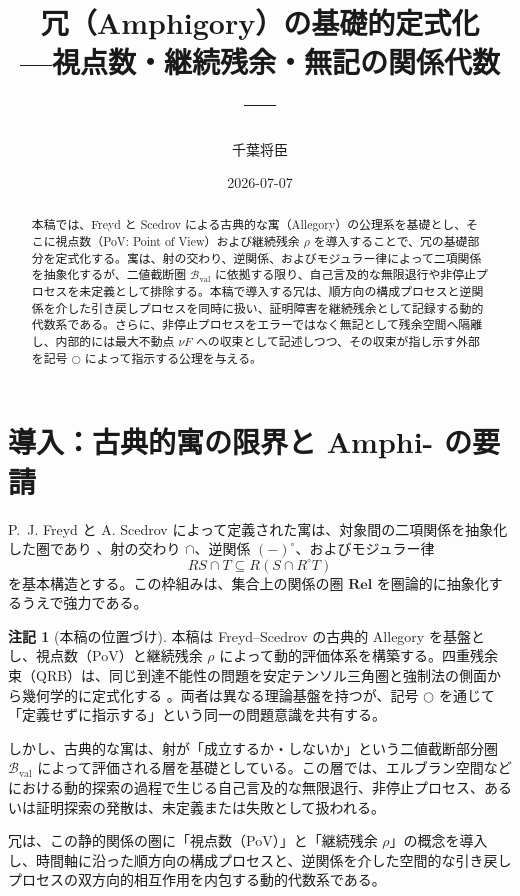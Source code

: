\documentclass[a4paper,11pt]{article}
\title{冗（Amphigory）の基礎的定式化\\
---視点数・継続残余・無記の関係代数---}
\author{千葉将臣}
\date{2026-07-07}
\newcommand{\dfix}{\bigcirc}
\newcommand{\Rel}{\mathbf{Rel}}
\theoremstyle{definition}
\newtheorem{note}[definition]{注記}
\begin{document}
\maketitle

\begin{abstract}
本稿では、Freyd と Scedrov による古典的な寓（Allegory）の公理系を基礎とし、そこに視点数（PoV: Point of View）および継続残余 $\rho$ を導入することで、冗の基礎部分を定式化する。寓は、射の交わり、逆関係、およびモジュラー律によって二項関係を抽象化するが、二値截断圏 $\mathcal{B}_{\mathrm{val}}$ に依拠する限り、自己言及的な無限退行や非停止プロセスを未定義として排除する。本稿で導入する冗は、順方向の構成プロセスと逆関係を介した引き戻しプロセスを同時に扱い、証明障害を継続残余として記録する動的代数系である。さらに、非停止プロセスをエラーではなく無記として残余空間へ隔離し、内部的には最大不動点 $\nu F$ への収束として記述しつつ、その収束が指し示す外部を記号 $\dfix$ によって指示する公理を与える。
\end{abstract}

\section{導入：古典的寓の限界と Amphi- の要請}
P.~J. Freyd と A. Scedrov によって定義された寓は、対象間の二項関係を抽象化した圏であり \cite{FreydScedrov1990}、射の交わり $\cap$、逆関係 $(-)^\circ$、およびモジュラー律
\[
RS \cap T \subseteq R(S \cap R^\circ T)
\]
を基本構造とする。この枠組みは、集合上の関係の圏 $\Rel$ を圏論的に抽象化するうえで強力である。

\begin{note}[本稿の位置づけ]
本稿は Freyd--Scedrov の古典的 Allegory を基盤とし、視点数（PoV）と継続残余 $\rho$ によって動的評価体系を構築する。四重残余束（QRB）は、同じ到達不能性の問題を安定テンソル三角圏と強制法の側面から幾何学的に定式化する \cite{ChibaQRB2026}。両者は異なる理論基盤を持つが、記号 $\dfix$ を通じて「定義せずに指示する」という同一の問題意識を共有する。
\end{note}

しかし、古典的な寓は、射が「成立するか・しないか」という二値截断部分圏 $\mathcal{B}_{\mathrm{val}}$ によって評価される層を基礎としている。この層では、エルブラン空間などにおける動的探索の過程で生じる自己言及的な無限退行、非停止プロセス、あるいは証明探索の発散は、未定義または失敗として扱われる。

冗は、この静的関係の圏に「視点数（PoV）」と「継続残余 $\rho$」の概念を導入し、時間軸に沿った順方向の構成プロセスと、逆関係を介した空間的な引き戻しプロセスの双方向的相互作用を内包する動的代数系である。
\end{document}
